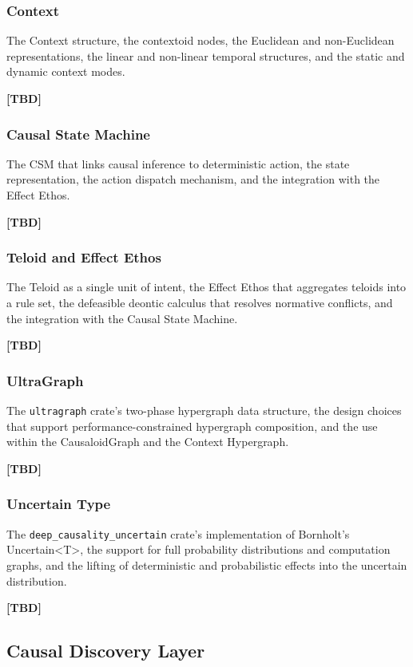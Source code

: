 \subsubsection{Context}
The Context structure, the contextoid nodes, the Euclidean and non-Euclidean representations, the linear and non-linear temporal structures, and the static and dynamic context modes.
 
\textbf{[TBD]}
 
\subsubsection{Causal State Machine}
The CSM that links causal inference to deterministic action, the state representation, the action dispatch mechanism, and the integration with the Effect Ethos.
 
\textbf{[TBD]}
 
\subsubsection{Teloid and Effect Ethos}
The Teloid as a single unit of intent, the Effect Ethos that aggregates teloids into a rule set, the defeasible deontic calculus that resolves normative conflicts, and the integration with the Causal State Machine.
 
\textbf{[TBD]}
 
\subsubsection{UltraGraph}
The \texttt{ultragraph} crate's two-phase hypergraph data structure, the design choices that support performance-constrained hypergraph composition, and the use within the CausaloidGraph and the Context Hypergraph.
 
\textbf{[TBD]}
 
\subsubsection{Uncertain Type}
The \texttt{deep\_causality\_uncertain} crate's implementation of Bornholt's Uncertain<T>, the support for full probability distributions and computation graphs, and the lifting of deterministic and probabilistic effects into the uncertain distribution.
 
\textbf{[TBD]}
 
 
\subsection{Causal Discovery Layer}
\label{sec:implementation_discovery}
 
